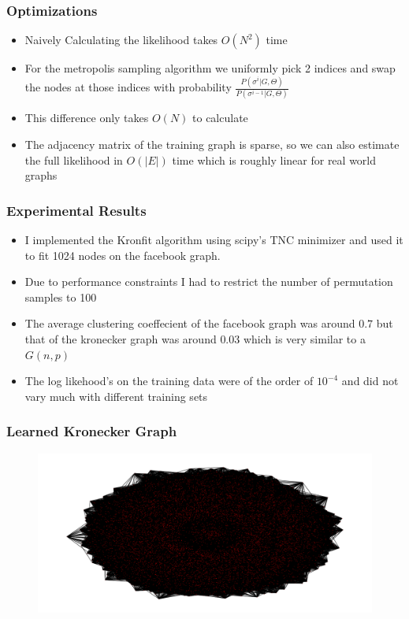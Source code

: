 \documentclass{beamer}
\begin{document}

\begin{frame}
\frametitle{Optimizations}
\begin{itemize}
\item Naively Calculating the likelihood takes $O(N^2)$ time
\item For the metropolis sampling algorithm we uniformly pick 2 indices and swap the nodes at those indices with probability $\frac{P(\sigma^i|G,\Theta)}{P(\sigma^{i-1}|G,\Theta)}$
\item This difference only takes $O(N)$ to calculate
\item The adjacency matrix of the training graph is sparse, so we can also estimate the full likelihood in $O(|E|)$ time which is roughly linear for real world graphs
\end{itemize}
\end{frame}

\begin{frame}
\frametitle{Experimental Results}
\begin{itemize}
\item I implemented the Kronfit algorithm using scipy's TNC minimizer and used it to fit 1024 nodes on the facebook graph.
\item Due to performance constraints I had to restrict the number of permutation samples to 100
\item The average clustering coeffecient of the facebook graph was around $0.7$ but that of the kronecker graph was around $0.03$ which is very similar to a $G(n,p)$
\item The log likehood's on the training data were of the order of $10^{-4}$ and did not vary much with different training sets
\end{itemize}
\end{frame}


\begin{frame}
\frametitle{Learned Kronecker Graph}
\begin{figure}
\includegraphics[width=\textwidth,height=\textheight,keepaspectratio]{kronecker_graph_P2}
\end{figure}
\end{frame}
\end{document}
